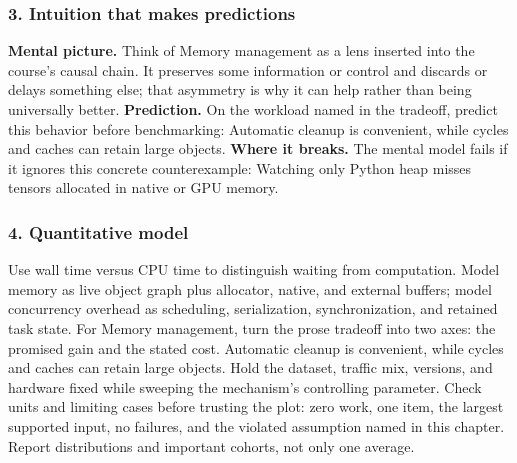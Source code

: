 \subsubsection*{3. Intuition that makes predictions}
\textbf{Mental picture.} Think of Memory management as a lens inserted into the course's causal chain. It preserves some information or control and discards or delays something else; that asymmetry is why it can help rather than being universally better.
\textbf{Prediction.} On the workload named in the tradeoff, predict this behavior before benchmarking: Automatic cleanup is convenient, while cycles and caches can retain large objects.
\textbf{Where it breaks.} The mental model fails if it ignores this concrete counterexample: Watching only Python heap misses tensors allocated in native or GPU memory.
\subsubsection*{4. Quantitative model}
Use wall time versus CPU time to distinguish waiting from computation. Model memory as live object graph plus allocator, native, and external buffers; model concurrency overhead as scheduling, serialization, synchronization, and retained task state.
For Memory management, turn the prose tradeoff into two axes: the promised gain and the stated cost. Automatic cleanup is convenient, while cycles and caches can retain large objects. Hold the dataset, traffic mix, versions, and hardware fixed while sweeping the mechanism's controlling parameter.
Check units and limiting cases before trusting the plot: zero work, one item, the largest supported input, no failures, and the violated assumption named in this chapter. Report distributions and important cohorts, not only one average.

